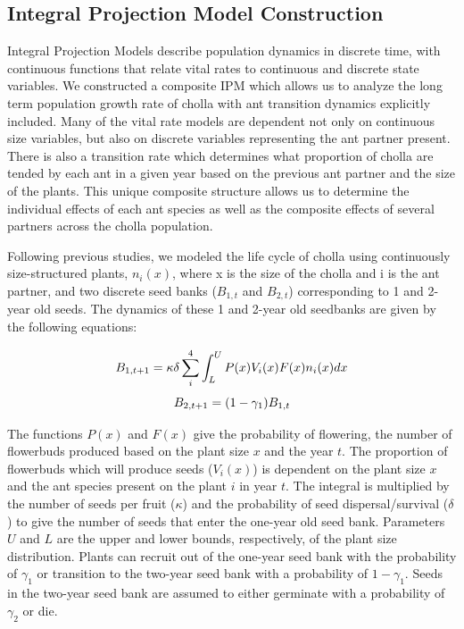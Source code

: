 \documentclass[11pt]{article}\usepackage[sc]{mathpazo} %
\begin{document}
  \subsection*{Integral Projection Model Construction}
  Integral Projection Models describe population dynamics in discrete time, with continuous functions that relate vital rates to continuous and discrete state variables. 
We constructed a composite IPM which allows us to analyze the long term population growth rate of cholla with ant transition dynamics explicitly included.
Many of the vital rate models are dependent not only on continuous size variables, but also on discrete variables representing the ant partner present.
There is also a transition rate which determines what proportion of cholla are tended by each ant in a given year based on the previous ant partner and the size of the plants. 
This unique composite structure allows us to determine the individual effects of each ant species as well as the composite effects of several partners across the cholla population. 

  Following previous studies, we modeled the life cycle of cholla using continuously size-structured plants, $n_i(x)$, where x is the size of the cholla and i is the ant partner, and two discrete seed banks ($B_{1,t}$ and $B_{2,t}$) corresponding to 1 and 2-year old seeds.
The dynamics of these 1 and 2-year old seedbanks are given by the following equations: 

  \begin{linenomath*}
		$$
		B_{1, t+1} = \kappa \delta \sum_{i}^{4} \int_L^U P(x) V_i(x) F(x) n_i(x) dx \\
		$$
		$$
		B_{2,t+1} =  (1 - \gamma_1)B_{1,t}\\
		$$
  \end{linenomath*}

  The functions $P(x)$ and $F(x)$ give the probability of flowering, the number of flowerbuds produced based on the plant size $x$ and the year $t$. 
The proportion of flowerbuds which will produce seeds ($V_i(x)$) is dependent on the plant size $x$ and the ant species present on the plant $i$ in year $t$. 
The integral is multiplied by the number of seeds per fruit ($\kappa$) and the probability of seed dispersal/survival ($\delta$) to give the number of seeds that enter the one-year old seed bank. 
Parameters $U$ and $L$ are the upper and lower bounds, respectively, of the plant size distribution. 
Plants can recruit out of the one-year seed bank with the probability of $\gamma_1$ or transition to the two-year seed bank with a probability of $1 - \gamma_1$. 
Seeds in the two-year seed bank are assumed to either germinate with a probability of $\gamma_2$ or die. 
		
\end{document}
